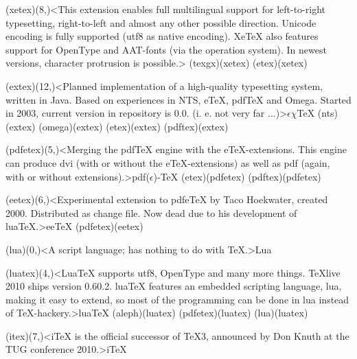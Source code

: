 \documentclass[
%
]{scrartcl}
\begin{document}
{	\tonode[\vip](xetex)(8,\layer)<This extension enables full multilingual support for left-to-right typesetting, right-to-left and almost any other possible direction. Unicode encoding is fully supported (utf8 as native encoding). XeTeX also features support for OpenType and AAT-fonts (via the operation system). In newest versions, character protrusion is possible.>{\XeTeX}
	\todraw(texgx)(xetex)
	\todraw*(etex)(xetex)
	
	\tonode[\experimental](extex)(12,\layer)<Planned implementation of a high-quality typesetting system, written in Java. Based on experiences in NTS, eTeX, pdfTeX and Omega. Started in 2003, current version in repository is 0.0. (i. e. not very far ...)>{$\epsilon\chi$\TeX}
	\todraw(nts)(extex)
	\todraw(omega)(extex)
	\todraw(etex)(extex)
	\todraw(pdftex)(extex)
	
	\tonode[\vip](pdfetex)(5,\layer)<Merging the pdfTeX engine with the eTeX-extensions. This engine can produce dvi (with or without the eTeX-extensions) as well as pdf (again, with or without extensions).>{pdf($\epsilon$)-\TeX}
	\todraw*(etex)(pdfetex)
	\todraw*(pdftex)(pdfetex)
	
	\steplayer[-2]
	\tonode[\experimental](eetex)(6,\layer)<Experimental extension to pdfeTeX by Taco Hoekwater, created 2000. Distributed as change file. Now dead due to his development of luaTeX.>{ee\TeX}
	\todraw(pdfetex)(eetex)
	
	\steplayer[-2]
	\tonode[\program](lua)(0,\layer)<A script language; has nothing to do with TeX.>{Lua}
	
	\tonode[\vip](luatex)(4,\layer)<LuaTeX supports utf8, OpenType and many more things. TeXlive 2010 ships version 0.60.2. luaTeX features an embedded scripting language, lua, making it easy to extend, so most of the programming can be done in lua instead of TeX-hackery.>{lua\TeX}
	\todraw(aleph)(luatex)
	\todraw*(pdfetex)(luatex)
	\todraw[dashed](lua)(luatex)
	
	\steplayer[-2]
	\tonode[\experimental](itex)(7,\layer)<iTeX is the official successor of TeX3, announced by Don Knuth at the TUG conference 2010.>{i\TeX}
}
\end{document}
